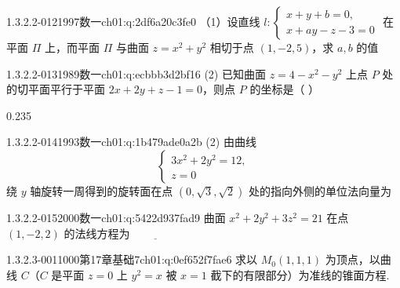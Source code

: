 \begin{q}{1.3.2.2-012}{1997数一}{ch01:q:2df6a20c3fe0}
（1）设直线 $l:\begin{cases}x+y+b=0,\\ x+ay-z-3=0\end{cases}$ 在平面 $\Pi$ 上，而平面 $\Pi$ 与曲面 $z=x^2+y^2$ 相切于点 $(1,-2,5)$，求 $a,b$ 的值
\end{q}

\begin{q}{1.3.2.2-013}{1989数一}{ch01:q:ecbbb3d2bf16}
(2) 已知曲面 $z=4-x^2-y^2$ 上点 $P$ 处的切平面平行于平面 $2x+2y+z-1=0$，则点 $P$ 的坐标是（ ）
\begin{opts}{0.235}
\hfill{}\hfill{}\hfill{}
\end{opts}
\end{q}

\begin{q}{1.3.2.2-014}{1993数一}{ch01:q:1b479ade0a2b}
(2) 由曲线 \[\begin{cases}3x^2+2y^2=12,\\ z=0\end{cases}\] 绕 $y$ 轴旋转一周得到的旋转面在点 $(0,\sqrt{3},\sqrt{2})$ 处的指向外侧的单位法向量为 \underline{\hspace{4em}}
\end{q}

\begin{q}{1.3.2.2-015}{2000数一}{ch01:q:5422d937fad9}
曲面 $x^2+2y^2+3z^2=21$ 在点 $(1,-2,2)$ 的法线方程为 $\underline{\hspace{4em}}$
\end{q}

\par\addvspace{2.4ex}\noindent
\begin{minipage}{\linewidth}

\begin{q}{1.3.2.3-001}{1000第17章基础7}{ch01:q:0ef652f7fae6}
求以 $M_0(1,1,1)$ 为顶点，以曲线 $C$（$C$ 是平面 $z=0$ 上 $y^2=x$ 被 $x=1$ 截下的有限部分）为准线的锥面方程.
\end{q}
\end{minipage}


